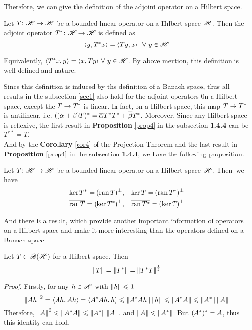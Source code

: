 \documentclass[a4paper,11pt]{report}
\begin{document}
Therefore, we can give the definition of the adjoint operator on a Hilbert space.
\begin{defn}
	Let $T \colon \mathscr{H} \rightarrow \mathscr{H}$ be a bounded linear operator on a Hilbert space $\mathscr{H}$. Then the adjoint operator $T^{*} \colon \mathscr{H} \rightarrow \mathscr{H}$ is defined as
	\begin{equation*}
		\langle y, T^{*}x \rangle = \langle Ty, x \rangle ~~ \forall~ y \in \mathscr{H}
	\end{equation*}
\end{defn}
\begin{rem}
	Equivalently, $\langle T^{*}x, y \rangle = \langle x, Ty \rangle ~ \forall~ y \in \mathscr{H}$. By above mention, this definition is well-defined and nature.
\end{rem}

Since this definition is induced by the definition of a Banach space, thus all results in the subsection \ref{sec1} also hold for the adjoint operators 0n a Hilbert space, except the $T \rightarrow T^{*}$ is linear. In fact, on a Hilbert space, this map $T \rightarrow T^{*}$ is antilinear, i.e. $((\alpha + \beta)T)^{*} = \overline{\alpha}T^{*}T^{*} + \overline{\beta}T^{*}$. Moreover, Since any Hilbert space is reflexive, the first result in \textbf{Proposition} \ref{prop4} in the subsection \textbf{1.4.4} can be $T^{**} = T$.\\
And by the \textbf{Corollary} \ref{cor4} of the Projection Theorem and the last result in \textbf{Proposition} \ref{prop4} in the subsection \textbf{1.4.4}, we have the following proposition.
\begin{prop}
	Let $T \colon \mathscr{H} \rightarrow \mathscr{H}$ be a bounded linear operator on a Hilbert space $\mathscr{H}$. Then, we have
	\begin{eqnarray*}
		\ker{T^{*}} = (\operatorname{ran}{T})^{\bot} &,& \ker{T}=(\operatorname{ran}{T^{*}})^{\bot} \\
		\overline{\operatorname{ran}{T}} = (\ker{T^{*}})^{\bot} &,& \overline{\operatorname{ran}{T^{*}}} = (\ker{T})^{\bot}
	\end{eqnarray*}
\end{prop}

And there is a result, which provide another important information of operators on a Hilbert space and make it more interesting than the operators defined on a Banach space.

\begin{thm} \label{thm0}
	Let $T \in \mathscr{B(H)}$ for a Hilbert space. Then
	\begin{equation*}
		\left\lVert T\right\lVert = \left\lVert T^{*}\right\lVert = \left\lVert T^{*}T\right\lVert^{\frac{1}{2}}
	\end{equation*}
\end{thm}  
\begin{proof}
	Firstly, for any $h \in \mathscr{H}$ with $\left\lVert h\right\lVert \leqslant 1$
	\begin{equation*}
		\left\lVert Ah\right\lVert^2 = \langle Ah,Ah \rangle = \langle A^{*}Ah,h \rangle \leqslant \left\lVert A^{*}Ah\right\lVert\left\lVert h\right\lVert \leqslant \left\lVert A^{*}A\right\lVert \leqslant \left\lVert A^{*}\right\lVert\left\lVert A\right\lVert
	\end{equation*}
	Therefore, $\left\lVert A\right\lVert^2  \leqslant \left\lVert A^{*}A\right\lVert \leqslant \left\lVert A^{*}\right\lVert\left\lVert A\right\lVert$. and $\left\lVert A\right\lVert \leqslant \left\lVert A^{*}\right\lVert$. But $(A^{*})^{*} = A$, thus this identity can hold.
\end{proof}
\end{document}
